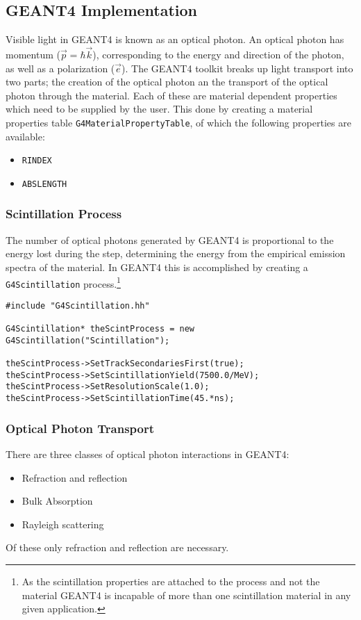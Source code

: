

\subsection{GEANT4 Implementation}
Visible light in GEANT4 is known as an optical photon.
An optical photon has momentum ($\vec{p} = \hbar \vec{k}$), corresponding to the energy and direction of the photon, as well as a polarization ($\vec{e}$).
The GEANT4 toolkit breaks up light transport into two parts; the creation of the optical photon an  the transport of the optical photon through the material.
Each of these are material dependent properties which need to be supplied by the user.
This done by creating a material properties table \lstinline{G4MaterialPropertyTable}, of which the following properties are available:
\begin{itemize}
    \item \verb+RINDEX+
    \item \verb+ABSLENGTH+
\end{itemize}
\subsubsection{Scintillation Process}
The number of optical photons generated by GEANT4 is proportional to the energy lost during the step, determining the energy from the empirical emission spectra of the material.
In GEANT4 this is accomplished by creating a \verb+G4Scintillation+ process.\footnote{As the scintillation properties are attached to the process and not the material GEANT4 is incapable of more than one scintillation material in any given application.}
\begin{lstlisting}
#include "G4Scintillation.hh"

G4Scintillation* theScintProcess = new G4Scintillation("Scintillation");

theScintProcess->SetTrackSecondariesFirst(true);
theScintProcess->SetScintillationYield(7500.0/MeV);
theScintProcess->SetResolutionScale(1.0);
theScintProcess->SetScintillationTime(45.*ns);
\end{lstlisting}

\subsubsection{Optical Photon Transport}
There are three classes of optical photon interactions in GEANT4:
\begin{itemize}
    \item Refraction and reflection
    \item Bulk Absorption
    \item Rayleigh scattering
\end{itemize}
Of these only refraction and reflection are necessary. \cite{cern_interactionsOfOpticalPhotons}

\cite{riggi}
